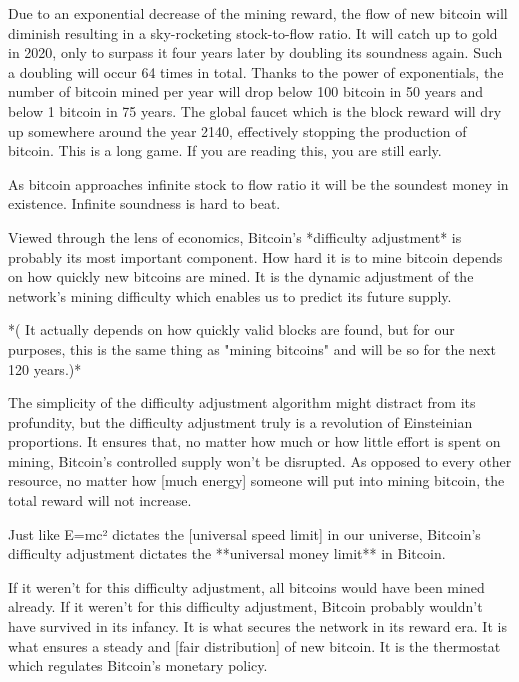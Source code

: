 {{{%



Due to an exponential decrease of the mining reward, the flow of new
bitcoin will diminish resulting in a sky-rocketing stock-to-flow ratio.
It will catch up to gold in 2020, only to surpass it four years later by
doubling its soundness again. Such a doubling will occur 64 times in
total. Thanks to the power of exponentials, the number of bitcoin mined
per year will drop below 100 bitcoin in 50 years and below 1 bitcoin in
75 years. The global faucet which is the block reward will dry up
somewhere around the year 2140, effectively stopping the production of
bitcoin. This is a long game. If you are reading this, you are still
early.

{%

As bitcoin approaches infinite stock to flow ratio it will be the
soundest money in existence. Infinite soundness is hard to beat.

Viewed through the lens of economics, Bitcoin's *difficulty adjustment*
is probably its most important component. How hard it is to mine bitcoin
depends on how quickly new bitcoins are mined\*. It is the dynamic
adjustment of the network's mining difficulty which enables us to
predict its future supply.

*(\* It actually depends on how quickly valid blocks are found, but for
our purposes, this is the same thing as "mining bitcoins" and will be so
for the next 120 years.)*

The simplicity of the difficulty adjustment algorithm might distract
from its profundity, but the difficulty adjustment truly is a revolution
of Einsteinian proportions. It ensures that, no matter how much or how
little effort is spent on mining, Bitcoin's controlled supply won't be
disrupted. As opposed to every other resource, no matter how [much
energy] someone will put into mining bitcoin, the total reward will not
increase.

Just like E=mc² dictates the [universal speed limit] in our universe,
Bitcoin's difficulty adjustment dictates the **universal money limit**
in Bitcoin.

If it weren't for this difficulty adjustment, all bitcoins would have
been mined already. If it weren't for this difficulty adjustment,
Bitcoin probably wouldn't have survived in its infancy. It is what
secures the network in its reward era. It is what ensures a steady and
[fair distribution] of new bitcoin. It is the thermostat which regulates
Bitcoin's monetary policy.

}}}}
